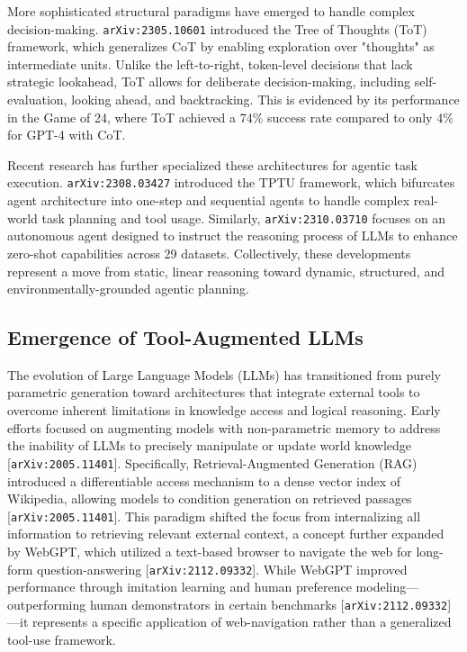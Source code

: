 \documentclass[11pt]{article}
\begin{document}
More sophisticated structural paradigms have emerged to handle complex decision-making. \texttt{arXiv:2305.10601} introduced the Tree of Thoughts (ToT) framework, which generalizes CoT by enabling exploration over "thoughts" as intermediate units. Unlike the left-to-right, token-level decisions that lack strategic lookahead, ToT allows for deliberate decision-making, including self-evaluation, looking ahead, and backtracking. This is evidenced by its performance in the Game of 24, where ToT achieved a 74\% success rate compared to only 4\% for GPT-4 with CoT.

Recent research has further specialized these architectures for agentic task execution. \texttt{arXiv:2308.03427} introduced the TPTU framework, which bifurcates agent architecture into one-step and sequential agents to handle complex real-world task planning and tool usage. Similarly, \texttt{arXiv:2310.03710} focuses on an autonomous agent designed to instruct the reasoning process of LLMs to enhance zero-shot capabilities across 29 datasets. Collectively, these developments represent a move from static, linear reasoning toward dynamic, structured, and environmentally-grounded agentic planning.

\subsection{Emergence of Tool-Augmented LLMs}

The evolution of Large Language Models (LLMs) has transitioned from purely parametric generation toward architectures that integrate external tools to overcome inherent limitations in knowledge access and logical reasoning. Early efforts focused on augmenting models with non-parametric memory to address the inability of LLMs to precisely manipulate or update world knowledge [\texttt{arXiv:2005.11401}]. Specifically, Retrieval-Augmented Generation (RAG) introduced a differentiable access mechanism to a dense vector index of Wikipedia, allowing models to condition generation on retrieved passages [\texttt{arXiv:2005.11401}]. This paradigm shifted the focus from internalizing all information to retrieving relevant external context, a concept further expanded by WebGPT, which utilized a text-based browser to navigate the web for long-form question-answering [\texttt{arXiv:2112.09332}]. While WebGPT improved performance through imitation learning and human preference modeling—outperforming human demonstrators in certain benchmarks [\texttt{arXiv:2112.09332}]—it represents a specific application of web-navigation rather than a generalized tool-use framework.
\end{document}
